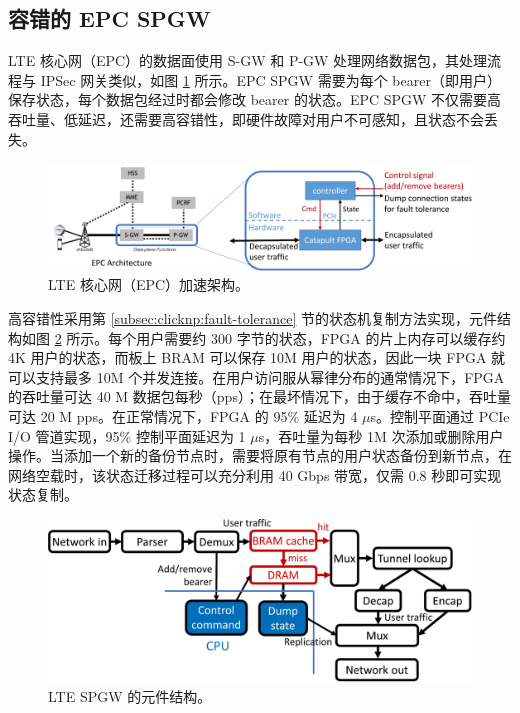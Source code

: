 \subsection{容错的 EPC SPGW}

LTE 核心网（EPC）的数据面使用 S-GW 和 P-GW 处理网络数据包，其处理流程与 IPSec 网关类似，如图 \ref{clicknp:fig:epc-arch} 所示。EPC SPGW 需要为每个 bearer（即用户）保存状态，每个数据包经过时都会修改 bearer 的状态。EPC SPGW 不仅需要高吞吐量、低延迟，还需要高容错性，即硬件故障对用户不可感知，且状态不会丢失。

\begin{figure}[htbp]
	\centering
	\includegraphics[width=1.0\textwidth]{image/EPC_arch}
	\caption{LTE 核心网（EPC）加速架构。}
	\label{clicknp:fig:epc-arch}
\end{figure}


高容错性采用第 \ref{subsec:clicknp:fault-tolerance} 节的状态机复制方法实现，元件结构如图 \ref{clicknp:fig:epc-element} 所示。每个用户需要约 300 字节的状态，FPGA 的片上内存可以缓存约 4K 用户的状态，而板上 BRAM 可以保存 10M 用户的状态，因此一块 FPGA 就可以支持最多 10M 个并发连接。在用户访问服从幂律分布的通常情况下，FPGA 的吞吐量可达 40 M 数据包每秒（pps）；在最坏情况下，由于缓存不命中，吞吐量可达 20 M pps。在正常情况下，FPGA 的 95\% 延迟为 4 $\mu$s。控制平面通过 PCIe I/O 管道实现，95\% 控制平面延迟为 1 $\mu$s，吞吐量为每秒 1M 次添加或删除用户操作。当添加一个新的备份节点时，需要将原有节点的用户状态备份到新节点，在网络空载时，该状态迁移过程可以充分利用 40 Gbps 带宽，仅需 0.8 秒即可实现状态复制。

\begin{figure}[htbp]
	\centering
	\includegraphics[width=1.0\textwidth]{image/EPC_element}
	\caption{LTE SPGW 的元件结构。}
	\label{clicknp:fig:epc-element}
\end{figure}

